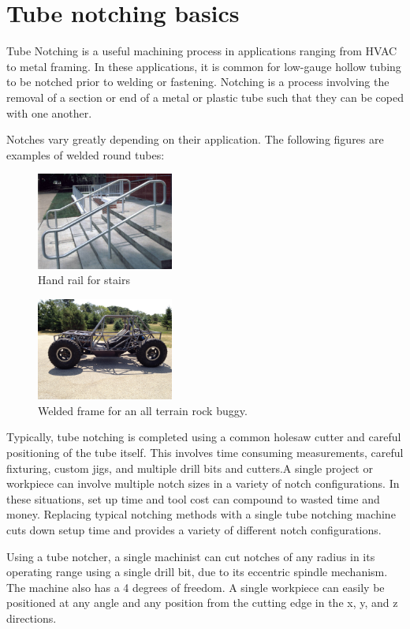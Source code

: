 \chapter{Tube notching basics}

Tube Notching is a useful machining process in applications ranging from HVAC to metal framing. In these applications, it is common for low-gauge hollow tubing to be notched prior to welding or fastening. Notching is a process involving the removal of a section or end of a metal or plastic tube such that they can be coped with one another. 

Notches vary greatly depending on their application. The following figures are examples of welded round tubes:
\begin{figure}[htp]
    \centering
    \includegraphics[width=0.4\textwidth]{./images/Chapter1-Basics/Railing}
    \caption{Hand rail for stairs}
    \label{fig:Stairs}
\end{figure}
\begin{figure}[htp]
    \centering
    \includegraphics[width=0.4\textwidth]{./images/Chapter1-Basics/Rock Buggy}
    \caption{Welded frame for an all terrain rock buggy.}
    \label{fig:Frame}
\end{figure}
\newpage
Typically, tube notching is completed using a common holesaw cutter and careful positioning of the tube itself. This involves time consuming measurements, careful fixturing, custom jigs, and multiple drill bits and cutters.A single project or workpiece can involve multiple notch sizes in a variety of notch configurations. In these situations, set up time and tool cost can compound to wasted time and money. Replacing typical notching methods with a single tube notching machine cuts down setup time and provides a variety of different notch configurations.

Using a tube notcher, a single machinist can cut  notches of any radius in its operating range using a single drill bit, due to its eccentric spindle mechanism. The machine also has a 4 degrees of freedom. A single workpiece can easily be positioned at any angle and any position from the cutting edge in the x, y, and z directions. 

